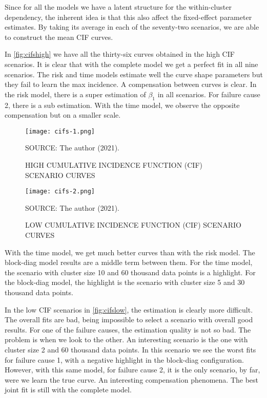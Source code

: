 Since for all the models we have a latent structure for the
within-cluster dependency, the inherent idea is that this also affect
the fixed-effect parameter estimates. By taking its average in each of
the seventy-two scenarios, we are able to construct the mean CIF curves.

In \autoref{fig:cifshigh} we have all the thirty-six curves obtained in
the high CIF scenarios. It is clear that with the complete model we get
a perfect fit in all nine scenarios. The risk and time models estimate
well the curve shape parameters but they fail to learn the max
incidence. A compensation between curves is clear. In the risk model,
there is a super estimation of \(\beta_{1}\) in all scenarios. For
failure cause 2, there is a sub estimation. With the time model, we
observe the opposite compensation but on a smaller scale.

\begin{figure}[H]
 \setlength{\abovecaptionskip}{.0001pt}
 \caption{HIGH CUMULATIVE INCIDENCE FUNCTION (CIF) SCENARIO CURVES}
 \vspace{0.2cm}\centering
 \texttt{[image: cifs-1.png]}\\
 \begin{footnotesize}
  SOURCE: The author (2021).
 \end{footnotesize}
 \label{fig:cifshigh}
\end{figure}

\begin{figure}[H]
 \setlength{\abovecaptionskip}{.0001pt}
 \caption{LOW CUMULATIVE INCIDENCE FUNCTION (CIF) SCENARIO CURVES}
 \vspace{0.2cm}\centering
 \texttt{[image: cifs-2.png]}\\
 \begin{footnotesize}
  SOURCE: The author (2021).
 \end{footnotesize}
 \label{fig:cifslow}
\end{figure}

With the time model, we get much better curves than with the risk
model. The block-diag model results are a middle term between them. For
the time model, the scenario with cluster size 10 and 60 thousand data
points is a highlight. For the block-diag model, the highlight is the
scenario with cluster size 5 and 30 thousand data points.

In the low CIF scenarios in \autoref{fig:cifslow}, the estimation is
clearly more difficult. The overall fits are bad, being impossible to
select a scenario with overall good results. For one of the failure
causes, the estimation quality is not so bad. The problem is when we
look to the other. An interesting scenario is the one with cluster size
2 and 60 thousand data points. In this scenario we see the worst fits
for failure cause 1, with a negative highlight in the block-diag
configuration. However, with this same model, for failure cause 2, it is
the only scenario, by far, were we learn the true curve. An interesting
compensation phenomena. The best joint fit is still with the complete
model.

